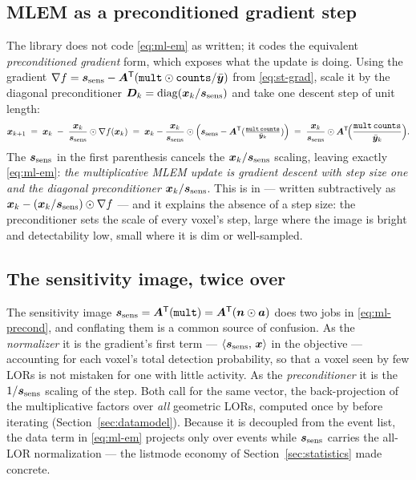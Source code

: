 \subsection{MLEM as a preconditioned gradient step}
\label{sec:mlem:precond}

The library does not code \eqref{eq:ml-em} as written; it codes the equivalent
\emph{preconditioned gradient} form, which exposes what the update is doing.
Using the gradient $\nabla f = \bm{s}_{\mathrm{sens}} - \bm{A}^{\mathsf{T}}(\texttt{mult}\odot\texttt{counts}/\bar{\bm{y}})$
from \eqref{eq:st-grad}, scale it by the diagonal preconditioner
$\bm D_k=\operatorname{diag}(\bm{x}_k/\bm{s}_{\mathrm{sens}})$ and take one descent step of unit length:
\begin{equation}
  \bm{x}_{k+1} \;=\; \bm{x}_k \;-\; \frac{\bm{x}_k}{\bm{s}_{\mathrm{sens}}}\odot\nabla f(\bm{x}_k)
            \;=\; \bm{x}_k - \frac{\bm{x}_k}{\bm{s}_{\mathrm{sens}}}\odot\Bigl(\bm{s}_{\mathrm{sens}} -
                  \bm{A}^{\mathsf{T}}(\tfrac{\texttt{mult}\,\texttt{counts}}{\bar{\bm{y}}_k})\Bigr)
            \;=\; \frac{\bm{x}_k}{\bm{s}_{\mathrm{sens}}}\odot\bm{A}^{\mathsf{T}}\!\Bigl(
                  \frac{\texttt{mult}\,\texttt{counts}}{\bar{\bm{y}}_k}\Bigr).
  \label{eq:ml-precond}
\end{equation}
The $\bm{s}_{\mathrm{sens}}$ in the first parenthesis cancels the $\bm{x}_k/\bm{s}_{\mathrm{sens}}$ scaling, leaving
exactly \eqref{eq:ml-em}: \emph{the multiplicative MLEM update is gradient descent
with step size one and the diagonal preconditioner $\bm{x}_k/\bm{s}_{\mathrm{sens}}$}. This is
 in  --- written subtractively as
$\bm{x}_k-(\bm{x}_k/\bm{s}_{\mathrm{sens}})\odot\nabla f$ --- and it explains the absence of a step
size: the preconditioner sets the scale of every voxel's step, large where the
image is bright and detectability low, small where it is dim or well-sampled.

\subsection{The sensitivity image, twice over}
\label{sec:mlem:sens}

The sensitivity image $\bm{s}_{\mathrm{sens}}=\bm{A}^{\mathsf{T}}(\texttt{mult})=\bm{A}^{\mathsf{T}}(\bm{n}\odot\bm{a})$ does two
jobs in \eqref{eq:ml-precond}, and conflating them is a common source of
confusion. As the \emph{normalizer} it is the gradient's first term ---
$\left\langle \bm{s}_{\mathrm{sens}},\, \bm{x}\right\rangle$ in the objective --- accounting for each voxel's total
detection probability, so that a voxel seen by few LORs is not mistaken for one
with little activity. As the \emph{preconditioner} it is the $1/\bm{s}_{\mathrm{sens}}$ scaling
of the step. Both call for the same vector, the back-projection of the
multiplicative factors over \emph{all} geometric LORs, computed once by
 before iterating (Section~\ref{sec:datamodel}). Because
it is decoupled from the event list, the data term in \eqref{eq:ml-em} projects
only over events while $\bm{s}_{\mathrm{sens}}$ carries the all-LOR normalization --- the listmode
economy of Section~\ref{sec:statistics} made concrete.

